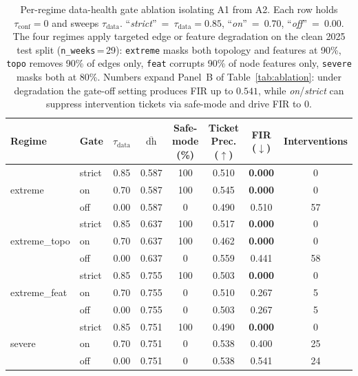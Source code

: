 \begin{table}[t]
\centering
\footnotesize
\setlength{\tabcolsep}{4pt}
\caption{Per-regime data-health gate ablation isolating A1 from A2.
Each row holds $\tau_{\mathrm{conf}}{=}0$ and sweeps $\tau_{\mathrm{data}}$.
``\textit{strict}''~=~$\tau_{\mathrm{data}}{=}0.85$, ``\textit{on}''~=~$0.70$,
``\textit{off}''~=~$0.00$. The four regimes apply targeted edge or feature
degradation on the clean 2025 test split (\texttt{n\_weeks}\,=\,29):
\texttt{extreme} masks both topology and features at 90\%, \texttt{topo}
removes 90\% of edges only, \texttt{feat} corrupts 90\% of node features
only, \texttt{severe} masks both at 80\%. Numbers expand Panel~B of
Table~\ref{tab:ablation}: under degradation the gate-off setting produces
FIR up to $0.541$, while \textit{on}/\textit{strict} can suppress
intervention tickets via safe-mode and drive FIR to $0$.}
\label{tab:a1_isolated}
\begin{tabular}{l l c c c c c c}
\toprule
Regime & Gate & $\tau_{\mathrm{data}}$ & $\overline{\mathrm{dh}}$ & Safe-mode (\%) & Ticket Prec. ($\uparrow$) & FIR ($\downarrow$) & Interventions \\
\midrule
\multirow{3}{*}{extreme}
& strict & 0.85 & 0.587 & 100 & 0.510 & \textbf{0.000} & 0 \\
& on     & 0.70 & 0.587 & 100 & 0.545 & \textbf{0.000} & 0 \\
& off    & 0.00 & 0.587 & 0   & 0.490 & 0.510          & 57 \\
\midrule
\multirow{3}{*}{extreme\_topo}
& strict & 0.85 & 0.637 & 100 & 0.517 & \textbf{0.000} & 0 \\
& on     & 0.70 & 0.637 & 100 & 0.462 & \textbf{0.000} & 0 \\
& off    & 0.00 & 0.637 & 0   & 0.559 & 0.441          & 58 \\
\midrule
\multirow{3}{*}{extreme\_feat}
& strict & 0.85 & 0.755 & 100 & 0.503 & \textbf{0.000} & 0 \\
& on     & 0.70 & 0.755 & 0   & 0.510 & 0.267          & 5 \\
& off    & 0.00 & 0.755 & 0   & 0.503 & 0.267          & 5 \\
\midrule
\multirow{3}{*}{severe}
& strict & 0.85 & 0.751 & 100 & 0.490 & \textbf{0.000} & 0 \\
& on     & 0.70 & 0.751 & 0   & 0.538 & 0.400          & 25 \\
& off    & 0.00 & 0.751 & 0   & 0.538 & 0.541          & 24 \\
\bottomrule
\end{tabular}
\end{table}
